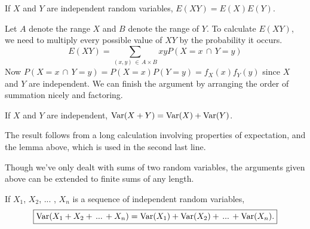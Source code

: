 \begin{lem}\label{ExpectationIndependentProduct} If $X$ and $Y$ are independent random variables, $E(XY) = E(X)E(Y)$.
\end{lem}
\begin{pf} Let $A$ denote the range $X$ and $B$ denote the range of $Y$. To calculate $E(XY)$, we need to multiply every possible value of $XY$ by the probability it occurs.
$$E(XY) = \sum_{(x, y) \,\in\, A \times B} xy P(X = x \,\cap\, Y= y)$$
\noindent Now $P(X = x \,\cap\, Y= y) = P(X = x)P(Y=y) = f_X(x)f_Y(y)$ since $X$ and $Y$ are independent. We can finish the argument by arranging the order of summation nicely and factoring. 
\end{pf}

\begin{thm}\label{VarianceIndependentSum} If $X$ and $Y$ are independent, $\operatorname{Var}(X+Y) = \operatorname{Var}(X) + \operatorname{Var}(Y)$.
\end{thm}
\begin{pf} The result follows from a long calculation involving properties of expectation, and the lemma above, which is used in the second last line.
\end{pf}

Though we've only dealt with sums of two random variables, the arguments given above can be extended to finite sums of any length.

\begin{cor}\label{expectationandvarianceofindependentsum}If $X_1$, $X_2$, ... , $X_n$ is a sequence of independent random variables,
$$\boxed{\operatorname{Var}(X_1 + X_2 + \, ... \, + X_n) = \operatorname{Var}(X_1) + \operatorname{Var}(X_2) + \, ... \, + \operatorname{Var}(X_n).}$$
\end{cor}

